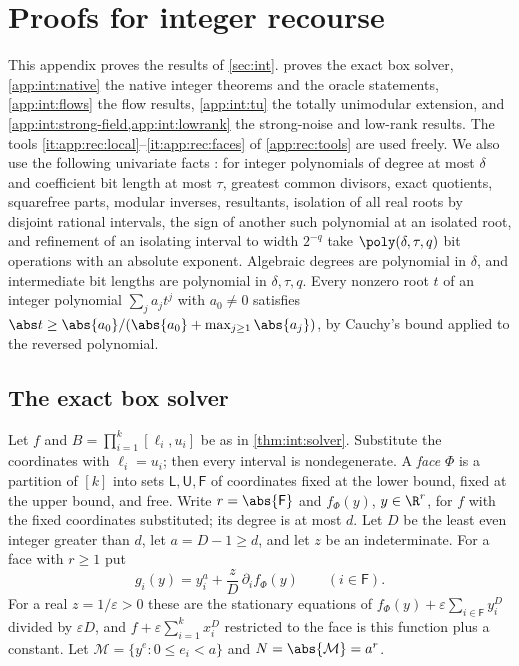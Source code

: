 \section{Proofs for integer recourse}\label{app:int}

This appendix proves the results of \cref{sec:int}. 
proves the exact box solver, \cref{app:int:native} the native integer
theorems and the oracle statements, \cref{app:int:flows} the flow results,
\cref{app:int:tu} the totally unimodular extension, and
\cref{app:int:strong-field,app:int:lowrank} the strong-noise and low-rank
results. The tools \ref{it:app:rec:local}--\ref{it:app:rec:faces} of
\cref{app:rec:tools} are used freely. We also use the following univariate
facts \citep{basu2006-algorithms-in-real-algebraic-geometry,mehlhorn2015-from-approximate-factorization-to-root}: for integer
polynomials of degree at most $\delta$ and coefficient bit length at most
$\tau$, greatest common divisors, exact quotients, squarefree parts, modular
inverses, resultants, isolation of all real roots by disjoint rational
intervals, the sign of another such polynomial at an isolated root, and
refinement of an isolating interval to width $2^{-q}$ take
$\poly(\delta,\tau,q)$ bit operations with an absolute exponent. Algebraic
degrees are polynomial in $\delta$, and intermediate bit lengths are
polynomial in $\delta,\tau,q$. Every nonzero root $t$ of an integer polynomial
$\sum_ja_jt^j$ with $a_0\ne0$ satisfies
$\abs t\ge\abs{a_0}/(\abs{a_0}+\max_{j\ge1}\abs{a_j})$, by Cauchy's bound applied
to the reversed polynomial.

\subsection{The exact box solver}\label{app:int:solver}

Let $f$ and $B=\prod_{i=1}^k[\ell_i,u_i]$ be as in \cref{thm:int:solver}.
Substitute the coordinates with $\ell_i=u_i$; then every interval is
nondegenerate. A \emph{face} $\Phi$ is a partition of $[k]$ into sets
$\mathsf L,\mathsf U,\mathsf F$ of coordinates fixed at the lower bound,
fixed at the upper bound, and free. Write $r=\abs{\mathsf F}$ and
$f_\Phi(y)$, $y\in\R^r$, for $f$ with the fixed coordinates substituted; its
degree is at most $d$. Let $D$ be the least even integer greater than $d$,
let $a=D-1\ge d$, and let $z$ be an indeterminate. For a face with $r\ge1$
put
\begin{equation}\label{eq:app:int:system}
 g_i(y)=y_i^a+\frac zD\,\partial_if_\Phi(y)\qquad(i\in\mathsf F).
\end{equation}
For a real $z=1/\varepsilon>0$ these are the stationary equations of
$f_\Phi(y)+\varepsilon\sum_{i\in\mathsf F}y_i^D$ divided by $\varepsilon D$, and
$f+\varepsilon\sum_{i=1}^kx_i^D$ restricted to the face is this function plus a
constant. Let $\mathcal M=\{y^e:0\le e_i<a\}$ and $N=\abs{\mathcal M}=a^r$.

